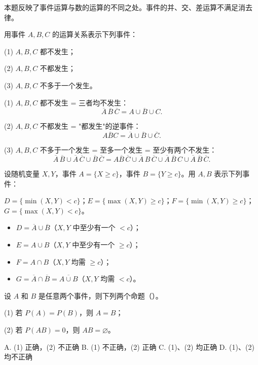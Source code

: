 \documentclass[lang=cn,11pt]{elegantbook}
\begin{document}
\begin{note}
本题反映了事件运算与数的运算的不同之处。事件的并、交、差运算不满足消去律。
\end{note}

\begin{exercise}\label{exer:1-29}
用事件 \(A,B,C\) 的运算关系表示下列事件：\par
(1) \(A,B,C\) 都不发生；\par
(2) \(A,B,C\) 不都发生；\par
(3) \(A,B,C\) 不多于一个发生。
\end{exercise}

\begin{solution}
(1) \(A,B,C\) 都不发生 = 三者均不发生：
\[\overline{A}\,\overline{B}\,\overline{C} = \overline{A\cup B\cup C}.\]

(2) \(A,B,C\) 不都发生 = "都发生"的逆事件：
\[\overline{ABC} = \overline{A}\cup\overline{B}\cup\overline{C}.\]

(3) \(A,B,C\) 不多于一个发生 = 至多一个发生 = 至少有两个不发生：
\[\overline{A}\,\overline{B}\cup\overline{A}\,\overline{C}\cup\overline{B}\,\overline{C} = A\overline{B}\,\overline{C}\cup\overline{A}\,B\,\overline{C}\cup\overline{A}\,\overline{B}\,C\cup\overline{A}\,\overline{B}\,\overline{C}.\]
\end{solution}

\begin{exercise}\label{exer:1-30}
设随机变量 \(X,Y\)，事件 \(A=\{X\ge c\}\)，事件 \(B=\{Y\ge c\}\)。用 \(A,B\) 表示下列事件：\par
\(D=\{\min(X,Y)<c\}\)；\quad \(E=\{\max(X,Y)\ge c\}\)；\quad \(F=\{\min(X,Y)\ge c\}\)；\quad \(G=\{\max(X,Y)<c\}\)。
\end{exercise}

\begin{solution}
\begin{itemize}
    \item \(D = \overline{A}\cup\overline{B}\)（\(X,Y\) 中至少有一个 \(<c\)）；
    \item \(E = A\cup B\)（\(X,Y\) 中至少有一个 \(\ge c\)）；
    \item \(F = A\cap B\)（\(X,Y\) 均需 \(\ge c\)）；
    \item \(G = \overline{A}\cap\overline{B} = \overline{A\cup B}\)（\(X,Y\) 均需 \(<c\)）。
\end{itemize}
\end{solution}

\begin{exercise}\label{exer:1-31}
设 \(A\) 和 \(B\) 是任意两个事件，则下列两个命题（\quad）。\par
(1) 若 \(P(A)=P(B)\)，则 \(A=B\)；\par
(2) 若 \(P(AB)=0\)，则 \(AB=\varnothing\)。
\par
A. (1) 正确，(2) 不正确\quad
B. (1) 不正确，(2) 正确\quad
C. (1)、(2) 均正确\quad
D. (1)、(2) 均不正确
\end{exercise}
\end{document}
